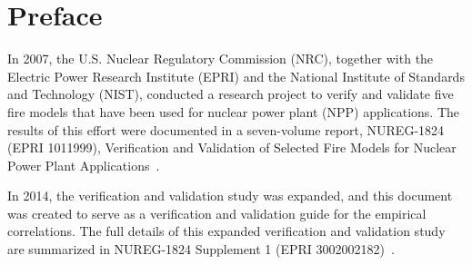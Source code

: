 \documentclass[11pt]{book}
\begin{document}
\newpage

\begin{minipage}[t][9in][s]{6.25in}


\vspace{3in}

\large
{}

\vfill

\hspace{1in}

\end{minipage}

\clearpage

\frontmatter

\pagestyle{plain}

\chapter{Preface}

In 2007, the U.S. Nuclear Regulatory Commission (NRC), together with the Electric Power Research Institute (EPRI) and the National Institute of Standards and Technology (NIST), conducted a research project to verify and validate five fire models that have been used for nuclear power plant (NPP) applications. The results of this effort were documented in a seven-volume report, NUREG-1824 (EPRI 1011999), Verification and Validation of Selected Fire Models for Nuclear Power Plant Applications~\cite{NUREG_1824}.

In 2014, the verification and validation study was expanded, and this document was created to serve as a verification and validation guide for the empirical correlations. The full details of this expanded verification and validation study are summarized in NUREG-1824 Supplement 1 (EPRI 3002002182)~\cite{NUREG_1824_Sup_1}.
\end{document}
